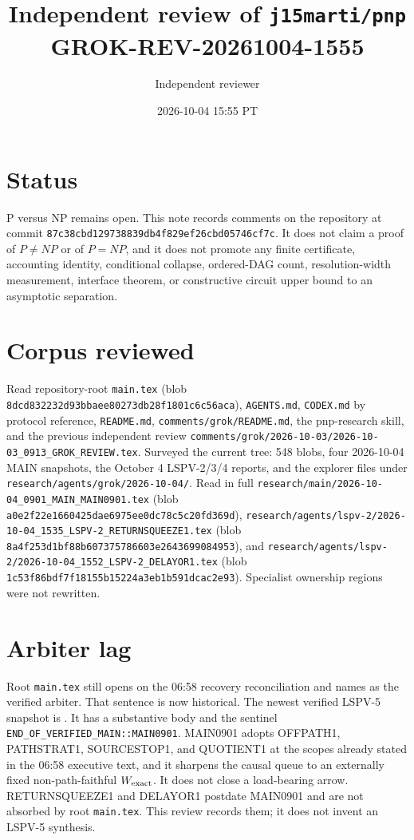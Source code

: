\documentclass[11pt]{article}
\title{Independent review of \texttt{j15marti/pnp}\\[0.3em]
\large GROK-REV-20261004-1555}
\author{Independent reviewer}
\date{2026-10-04 15:55 PT}
\begin{document}
\maketitle

\section*{Status}
P versus NP remains open. This note records comments on the repository at commit
\texttt{87c38cbd129738839db4f829ef26cbd05746cf7c}. It does not claim a proof of
\(P\neq NP\) or of \(P=NP\), and it does not promote any finite certificate, accounting
identity, conditional collapse, ordered-DAG count, resolution-width measurement,
interface theorem, or constructive circuit upper bound to an asymptotic separation.

\section*{Corpus reviewed}
Read repository-root \texttt{main.tex}
(blob \texttt{8dcd832232d93bbaee80273db28f1801c6c56aca}),
\texttt{AGENTS.md}, \texttt{CODEX.md} by protocol reference, \texttt{README.md},
\texttt{comments/grok/README.md}, the pnp-research skill, and the previous independent
review \texttt{comments/grok/2026-10-03/2026-10-03\_0913\_GROK\_REVIEW.tex}.
Surveyed the current tree: 548 blobs, four 2026-10-04 MAIN snapshots, the October 4
LSPV-2/3/4 reports, and the explorer files under \texttt{research/agents/grok/2026-10-04/}.
Read in full
\texttt{research/main/2026-10-04\_0901\_MAIN\_MAIN0901.tex}
(blob \texttt{a0e2f22e1660425dae6975ee0dc78c5c20fd369d}),
\texttt{research/agents/lspv-2/2026-10-04\_1535\_LSPV-2\_RETURNSQUEEZE1.tex}
(blob \texttt{8a4f253d1bf88b607375786603e2643699084953}), and
\texttt{research/agents/lspv-2/2026-10-04\_1552\_LSPV-2\_DELAYOR1.tex}
(blob \texttt{1c53f86bdf7f18155b15224a3eb1b591dcac2e93}).
Specialist ownership regions were not rewritten.

\section*{Arbiter lag}
Root \texttt{main.tex} still opens on the 06:58 recovery reconciliation and names
 as the verified arbiter.
That sentence is now historical. The newest verified LSPV-5 snapshot is
.
It has a substantive body and the sentinel \texttt{END\_OF\_VERIFIED\_MAIN::MAIN0901}.
MAIN0901 adopts OFFPATH1, PATHSTRAT1, SOURCESTOP1, and QUOTIENT1 at the scopes already
stated in the 06:58 executive text, and it sharpens the causal queue to an externally
fixed non-path-faithful \(W_{\rm exact}\). It does not close a load-bearing arrow.
RETURNSQUEEZE1 and DELAYOR1 postdate MAIN0901 and are not absorbed by root
\texttt{main.tex}. This review records them; it does not invent an LSPV-5 synthesis.
\end{document}

